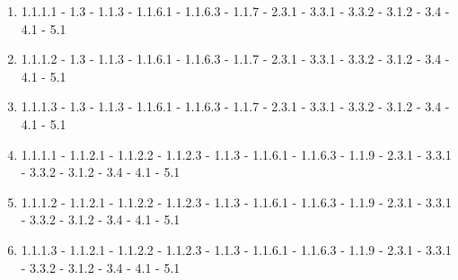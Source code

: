 \documentclass{report}
\begin{document}
\begin{enumerate}
                \item 1.1.1.1 - 1.3 - 1.1.3 - 1.1.6.1 - 1.1.6.3 - 1.1.7 - 2.3.1 - 3.3.1 - 3.3.2 - 3.1.2 - 3.4 - 4.1 - 5.1
                \item 1.1.1.2 - 1.3 - 1.1.3 - 1.1.6.1 - 1.1.6.3 - 1.1.7 - 2.3.1 - 3.3.1 - 3.3.2 - 3.1.2 - 3.4 - 4.1 - 5.1
                \item 1.1.1.3 - 1.3 - 1.1.3 - 1.1.6.1 - 1.1.6.3 - 1.1.7 - 2.3.1 - 3.3.1 - 3.3.2 - 3.1.2 - 3.4 - 4.1 - 5.1
                \item 1.1.1.1 - 1.1.2.1 - 1.1.2.2 - 1.1.2.3 - 1.1.3 - 1.1.6.1 - 1.1.6.3 - 1.1.9 - 2.3.1 - 3.3.1 - 3.3.2 - 3.1.2 - 3.4 - 4.1 - 5.1
                \item 1.1.1.2 - 1.1.2.1 - 1.1.2.2 - 1.1.2.3 - 1.1.3 - 1.1.6.1 - 1.1.6.3 - 1.1.9 - 2.3.1 - 3.3.1 - 3.3.2 - 3.1.2 - 3.4 - 4.1 - 5.1
                \item 1.1.1.3 - 1.1.2.1 - 1.1.2.2 - 1.1.2.3 - 1.1.3 - 1.1.6.1 - 1.1.6.3 - 1.1.9 - 2.3.1 - 3.3.1 - 3.3.2 - 3.1.2 - 3.4 - 4.1 - 5.1
            \end{enumerate}
\end{document}
